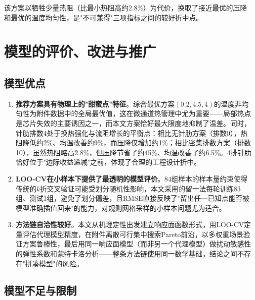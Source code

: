 \documentclass[12pt,a4paper]{ctexart}
\begin{document}
该方案以牺牲少量热阻（比最小热阻高约2.8\%）为代价，换取了接近最优的压降和最优的温度均匀性，是"不可兼得"三项指标之间的较好折中点。

\section{模型的评价、改进与推广}

\subsection{模型优点}

\begin{enumerate}
\item \textbf{推荐方案具有物理上的"甜蜜点"特征}。综合最优方案$(0.2,4.5,4)$的温度非均匀性为附件数据中的全局最优值，这在微通道热管理中尤为重要——局部热点是芯片失效的主要诱因之一，而本文方案恰好最大限度地抑制了温差。同时，针肋排数4处于换热强化与流阻增长的平衡点：相比无针肋方案（排数0），热阻降低约2\%、均温改善约9\%，而压降仅增加约1\%；相比密集排数方案（排数10），虽然热阻略高2.8\%，但压降节省了约45\%、均温改善了约6.5\%。4排针肋恰好位于"边际收益递减"之前，体现了合理的工程设计折中。

\item \textbf{LOO-CV在小样本下提供了最透明的模型评价}。84组样本的样本量约束使得传统的$k$折交叉验证可能受划分随机性影响，本文采用的留一法每轮训练83组、测试1组，避免了划分偏差，且RMSE直接反映了"留出任一已知点能否被模型准确插值回来"的能力，对规则网格采样的小样本问题尤为适合。

\item \textbf{方法链自洽性较好}。本文从机理定性出发建立响应面函数形式，用LOO-CV定量评估代理模型精度，在附件离散可行集中搜索Pareto前沿，以多权重场景验证方案鲁棒性，最后用同一响应面模型（而非另一个代理模型）做扰动敏感性的弹性系数和蒙特卡洛分析——整条方法链使用同一数学基础，结论之间不存在"拼凑模型"的风险。
\end{enumerate}

\subsection{模型不足与限制}
\end{document}
